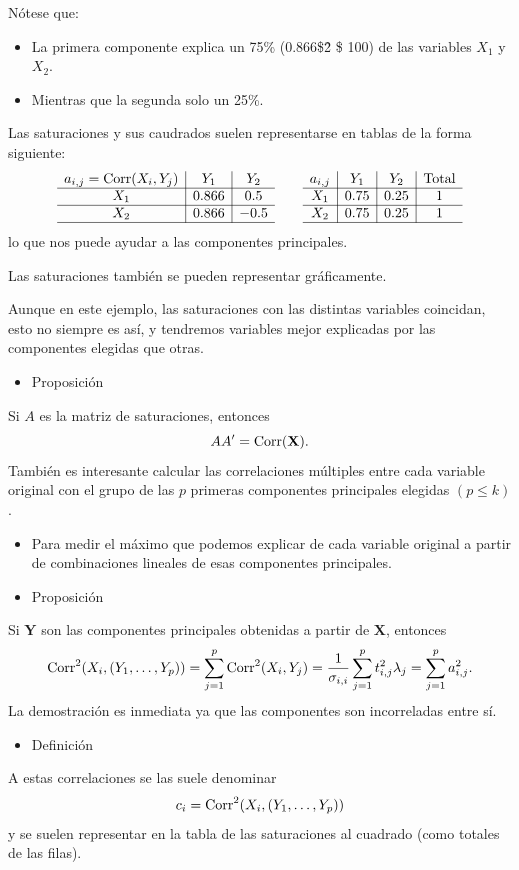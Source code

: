 Nótese que:
\begin{itemize}
	\item La primera componente explica un 75\% (0.866\$\^2 \$ 100) de las variables $X_1$ y $X_2$.
	\item Mientras que la segunda solo un 25\%.
\end{itemize}
Las saturaciones y sus caudrados suelen representarse en tablas de la forma siguiente:
\[ \begin{array}{c|c|c}
	a_{i,j}=\operatorname{Corr}(X_i,Y_j) & Y_1 & Y_2\\ \hline
	X_1 & 0.866 & 0.5\\ \hline
	X_2 & 0.866 & -0.5\\ \hline
\end{array}\qquad\begin{array}{c|c|c|c}
a_{i,j} & Y_1 & Y_2 & \text{Total}\\ \hline
X_1 & 0.75 & 0.25 & 1\\ \hline
X_2 & 0.75 & 0.25 & 1\\ \hline
\end{array} \] lo que nos puede ayudar a  las componentes principales.

Las saturaciones también se pueden representar gráficamente.

Aunque en este ejemplo, las saturaciones con las distintas variables coincidan, esto no siempre es así, y tendremos variables mejor explicadas por las componentes elegidas que otras.
\begin{itemize}[label=\color{red}\textbullet, leftmargin=*]
	\item \color{lightblue}Proposición
\end{itemize}
Si $A$ es la matriz de saturaciones, entonces \[ AA'=\operatorname{Corr}(\mathbf{X}). \]
También es interesante calcular las correlaciones múltiples entre cada variable original con el grupo de las $p$ primeras componentes principales elegidas $(p\le k)$.
\begin{itemize}
	\item Para medir el máximo que podemos explicar de cada variable original a partir de combinaciones lineales de esas componentes principales.
\end{itemize}
\begin{itemize}[label=\color{red}\textbullet, leftmargin=*]
	\item \color{lightblue}Proposición
\end{itemize}
Si $\mathbf{Y}$ son las componentes principales obtenidas a partir de $\mathbf{X}$, entonces \[ \operatorname{Corr}^2(X_i,(Y_1,\dots,Y_p))=\sum_{j=1}^{p}\operatorname{Corr}^2(X_i,Y_j)=\dfrac{1}{\sigma_{i,i}}\sum_{j=1}^{p}t_{i,j}^2\lambda_j=\sum_{j=1}^{p}a_{i,j}^2. \]
La demostración es inmediata ya que las componentes son incorreladas entre sí.
\begin{itemize}[label=\color{red}\textbullet, leftmargin=*]
	\item \color{lightblue}Definición
\end{itemize}
A estas correlaciones se las suele denominar  \[ c_i=\operatorname{Corr}^2(X_i,(Y_1,\dots,Y_p)) \]y se suelen representar en la tabla de las saturaciones al cuadrado (como totales de las filas).


